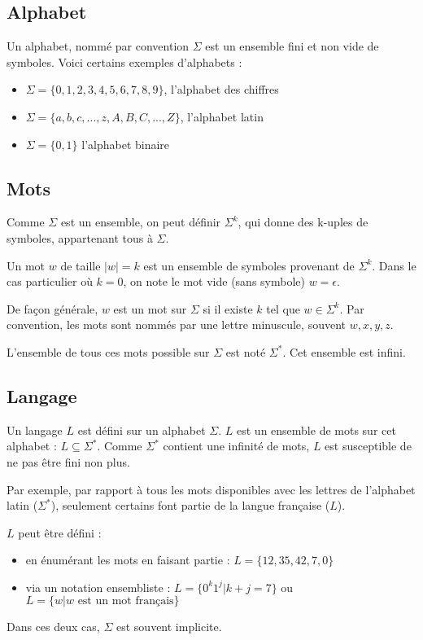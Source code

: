 	\subsection{Alphabet}
	
	Un alphabet, nommé par convention $\Sigma$ est un ensemble fini et non vide de symboles.
	Voici certains exemples d'alphabets :
	\begin{itemize}
		\item $\Sigma = \{0,1,2,3,4,5,6,7,8,9\}$, l'alphabet des chiffres
		\item $\Sigma = \{a,b,c,...,z,A,B,C,...,Z\}$, l'alphabet latin
		\item $\Sigma = \{0,1\}$ l'alphabet binaire
	\end{itemize}

	\subsection{Mots}
	
	Comme $\Sigma$ est un ensemble, on peut définir $\Sigma^k$, qui donne des k-uples de symboles, appartenant tous à $\Sigma$.
	
	Un mot $w$ de taille $|w|=k$ est un ensemble de symboles provenant de $\Sigma^k$. Dans le cas particulier où $k=0$, on note le mot vide (sans symbole) $w=\epsilon$.
	
	De façon générale, $w$ est un mot sur $\Sigma$ si il existe $k$ tel que $w \in \Sigma^k$. Par convention, les mots sont nommés par une lettre minuscule, souvent $w,x,y,z$. 
	
	L'ensemble de tous ces mots possible sur $\Sigma$ est noté $\Sigma^*$. Cet ensemble est infini.
	

	
	\subsection{Langage}
	
	Un langage $L$ est défini sur un alphabet $\Sigma$. $L$ est un ensemble de mots sur cet alphabet : $L \subseteq \Sigma^*$. Comme $\Sigma^*$ contient une infinité de mots, $L$ est susceptible de ne pas être fini non plus.
	
	Par exemple, par rapport à tous les mots disponibles avec les lettres de l'alphabet latin ($\Sigma^*$), seulement certains font partie de la langue française ($L$).
	
	$L$ peut être défini  :
	\begin{itemize}
		\item en énumérant les mots en faisant partie : $L=\{12,35,42,7,0\}$
		\item via un notation ensembliste : $L=\{0^k1^j|k+j=7\}$ ou $L=\{w|w \text{ est un mot français}\}$
	\end{itemize}
	Dans ces deux cas, $\Sigma$ est souvent implicite.
	
